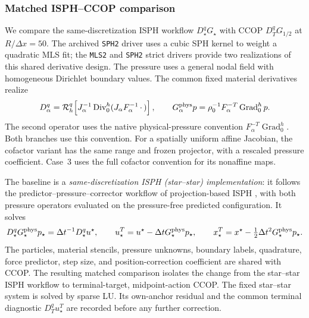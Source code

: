 \documentclass[11pt]{article}
\theoremstyle{plain}
\theoremstyle{definition}
\theoremstyle{remark}
\newcommand{\Grad}{\operatorname{Grad}}
\newcommand{\Div}{\operatorname{Div}}
\begin{document}
\subsubsection{Matched ISPH--CCOP comparison}

We compare the same-discretization ISPH workflow $D_\star^qG_\star$ with CCOP
$D_T^qG_{1/2}$ at $R/\Delta x=50$.  The archived \texttt{SPH2}
driver uses a cubic SPH kernel to weight a quadratic MLS fit; the \texttt{MLS2}
and \texttt{SPH2} strict drivers provide two realizations of this shared
derivative design.  The pressure uses a general nodal field with homogeneous
Dirichlet boundary values.
The common fixed material derivatives realize
\begin{equation}
 D_\alpha^q=\mathcal R_h^q\!\left[
 J_\alpha^{-1}\Div_0^h(J_\alpha F_\alpha^{-1}\,\cdot\,)
 \right],\qquad
 G_\alpha^{\rm phys}p=\rho_0^{-1}F_\alpha^{-T}\Grad_0^hp.
 \label{eq:case2_physical_action}
\end{equation}
The second operator uses the native physical-pressure convention
$F_\alpha^{-T}\Grad_0^h$.  Both branches use this convention.  For a spatially
uniform affine Jacobian, the cofactor variant has the same range and frozen
projector, with a rescaled pressure coefficient.  Case~3 uses the full
cofactor convention for its nonaffine maps.

The baseline is a \emph{same-discretization ISPH (star--star) implementation}:
it follows the predictor--pressure--corrector workflow of projection-based
ISPH \cite{CumminsRudman1999,XuStansbyLaurence2009}, with both pressure
operators evaluated on the pressure-free predicted configuration.  It solves
\begin{equation}
 D_\star^qG_\star^{\rm phys}p_\star
  =\Delta t^{-1}D_\star^qu^\star,\qquad
 u_\star^T=u^\star-\Delta tG_\star^{\rm phys}p_\star,\qquad
 x_\star^T=x^\star-\tfrac12\Delta t^2G_\star^{\rm phys}p_\star.
 \label{eq:case2_same_discretization_isph}
\end{equation}
The particles, material stencils, pressure unknowns, boundary labels,
quadrature, force predictor, step size, and position-correction coefficient
are shared with CCOP.  The resulting matched comparison isolates the change
from the star--star ISPH workflow to terminal-target, midpoint-action CCOP.
The fixed star--star system is solved by sparse LU.  Its own-anchor residual
and the common terminal diagnostic $D_T^qu_\star^T$ are recorded before any
further correction.
\end{document}
